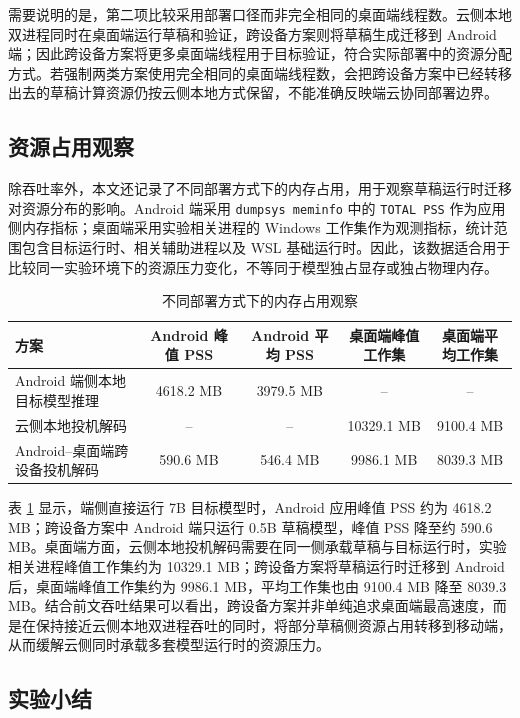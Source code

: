 需要说明的是，第二项比较采用部署口径而非完全相同的桌面端线程数。云侧本地双进程同时在桌面端运行草稿和验证，跨设备方案则将草稿生成迁移到 Android 端；因此跨设备方案将更多桌面端线程用于目标验证，符合实际部署中的资源分配方式。若强制两类方案使用完全相同的桌面端线程数，会把跨设备方案中已经转移出去的草稿计算资源仍按云侧本地方式保留，不能准确反映端云协同部署边界。

\subsection{资源占用观察}

除吞吐率外，本文还记录了不同部署方式下的内存占用，用于观察草稿运行时迁移对资源分布的影响。Android 端采用 \texttt{dumpsys meminfo} 中的 \texttt{TOTAL PSS} 作为应用侧内存指标；桌面端采用实验相关进程的 Windows 工作集作为观测指标，统计范围包含目标运行时、相关辅助进程以及 WSL 基础运行时。因此，该数据适合用于比较同一实验环境下的资源压力变化，不等同于模型独占显存或独占物理内存。

\begin{table}[htbp]
  \centering
  \caption{不同部署方式下的内存占用观察}
  \label{tab:memory-observation}
  \scriptsize
  \setlength{\tabcolsep}{3pt}
  \begin{tabularx}{0.98\textwidth}{Xcccc}
    \toprule
    方案 & Android 峰值 PSS & Android 平均 PSS & 桌面端峰值工作集 & 桌面端平均工作集 \\
    \midrule
    Android 端侧本地目标模型推理 & 4618.2 MB & 3979.5 MB & -- & -- \\
    云侧本地投机解码 & -- & -- & 10329.1 MB & 9100.4 MB \\
    Android--桌面端跨设备投机解码 & 590.6 MB & 546.4 MB & 9986.1 MB & 8039.3 MB \\
    \bottomrule
  \end{tabularx}
\end{table}

表 \ref{tab:memory-observation} 显示，端侧直接运行 7B 目标模型时，Android 应用峰值 PSS 约为 4618.2 MB；跨设备方案中 Android 端只运行 0.5B 草稿模型，峰值 PSS 降至约 590.6 MB。桌面端方面，云侧本地投机解码需要在同一侧承载草稿与目标运行时，实验相关进程峰值工作集约为 10329.1 MB；跨设备方案将草稿运行时迁移到 Android 后，桌面端峰值工作集约为 9986.1 MB，平均工作集也由 9100.4 MB 降至 8039.3 MB。结合前文吞吐结果可以看出，跨设备方案并非单纯追求桌面端最高速度，而是在保持接近云侧本地双进程吞吐的同时，将部分草稿侧资源占用转移到移动端，从而缓解云侧同时承载多套模型运行时的资源压力。

\subsection{实验小结}

